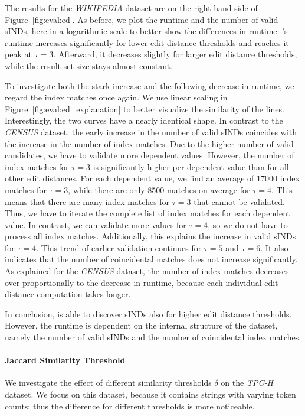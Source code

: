 The results for the \emph{WIKIPEDIA} dataset are on the right-hand side of Figure~\ref{fig:eval:ed}.
As before, we plot the runtime and the number of valid sINDs, here in a logarithmic scale to better show the differences in runtime.
\sawfish's runtime increases significantly for lower edit distance thresholds and reaches it peak at $\tau = 3$.
Afterward, it decreases slightly for larger edit distance thresholds, while the result set size stays almost constant.

To investigate both the stark increase and the following decrease in runtime, we regard the index matches once again.
We use linear scaling in Figure~\ref{fig:eval:ed_explanation} to better visualize the similarity of the lines.
Interestingly, the two curves have a nearly identical shape.
In contrast to the \emph{CENSUS} dataset, the early increase in the number of valid sINDs coincides with the increase in the number of index matches.
Due to the higher number of valid candidates, we have to validate more dependent values.
However, the number of index matches for $\tau = 3$ is significantly higher per dependent value than for all other edit distances.
For each dependent value, we find an average of \num{17000} index matches for $\tau = 3$, while there are only \num{8500} matches on average for $\tau = 4$.
This means that there are many index matches for $\tau = 3$ that cannot be validated.
Thus, we have to iterate the complete list of index matches for each dependent value.
In contrast, we can validate more values for $\tau = 4$, so we do not have to process all index matches.
Additionally, this explains the increase in valid sINDs for $\tau = 4$.
This trend of earlier validation continues for $\tau = 5$ and $\tau = 6$.
It also indicates that the number of coincidental matches does not increase significantly.
As explained for the \emph{CENSUS} dataset, the number of index matches decreases over-proportionally to the decrease in runtime, because each individual edit distance computation takes longer.


In conclusion, \sawfish is able to discover sINDs also for higher edit distance thresholds.
However, the runtime is dependent on the internal structure of the dataset, namely the number of valid sINDs and the number of coincidental index matches.

\paragraph{Jaccard Similarity Threshold}
We investigate the effect of different similarity thresholds $\delta$ on the \emph{TPC-H} dataset.
We focus on this dataset, because it contains strings with varying token counts; thus the difference for different thresholds is more noticeable.

